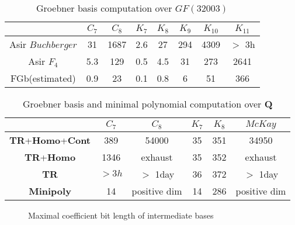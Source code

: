 \documentclass[runningheads]{cl2emult}
\begin{document}
\begin{table}[hbtp]
\begin{center}
\begin{tabular}{|c||c|c|c|c|c|c|c|} \hline
		& $C_7$ & $C_8$ & $K_7$ & $K_8$ & $K_9$ & $K_{10}$ & $K_{11}$ \\ \hline
Asir $Buchberger$	& 31 & 1687  & 2.6  & 27 & 294  & 4309 & $>$ 3h \\ \hline
Asir $F_4$	& 5.3 & 129 & 0.5  & 4.5 & 31  & 273 & 2641 \\ \hline
FGb(estimated)	& 0.9 & 23 & 0.1 & 0.8 & 6 & 51 & 366 \\ \hline
\end{tabular}
\end{center}
\caption{Groebner basis computation over $GF(32003)$}
\label{tab:gbmod}
\end{table}
\begin{table}[hbtp]
\begin{center}
\begin{tabular}{|c||c|c|c|c|c|} \hline
		& $C_7$ & $C_8$ & $K_7$ & $K_8$ & $McKay$ \\ \hline
{\bf TR}+{\bf Homo}+{\bf Cont} & 389 & 54000 & 35 & 351 & 34950 \\ \hline
{\bf TR}+{\bf Homo} & 1346 & exhaust & 35 & 352 & exhaust \\ \hline
{\bf TR} & $> 3h $ & $>$ 1day & 36 & 372 & $>$ 1day \\ \hline
{\bf Minipoly} & 14 & positive dim & 14 & 286 & positive dim \\ \hline
\end{tabular}
\end{center}
\caption{Groebner basis and minimal polynomial computation over {\bf Q}}
\label{tab:gbq}
\end{table}

\begin{figure}[hbtp]
\begin{center}
\epsfxsize=12cm
\end{center}
\caption{Maximal coefficient bit length of intermediate bases}
\label{tab:f4vsbuch}
\end{figure}
\end{document}
